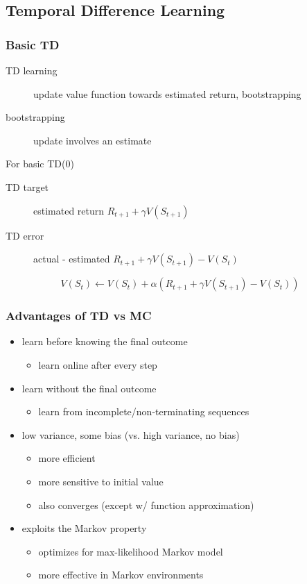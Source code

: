 \documentclass[]{article}
\theoremstyle{definition}
\begin{document}
\subsection{Temporal Difference Learning}%
\label{sub:temporal_difference_learning}

\subsubsection{Basic TD}%
\label{ssub:basic_td}
\begin{description}
    \item[TD learning] update value function towards estimated return, bootstrapping
    \item[bootstrapping] update involves an estimate
\end{description}
For basic TD(0)
\begin{description}
    \item[TD target] estimated return $R_{t+1} + \gamma V(S_{t+1})$
    \item[TD error] actual - estimated $R_{t+1} + \gamma V(S_{t+1}) - V(S_t)$
\end{description}

\begin{equation*}
    V(S_t) \gets V(S_t) + \alpha(R_{t+1} + \gamma V(S_{t+1}) - V(S_t))
\end{equation*}

\subsubsection{Advantages of TD vs MC}%
\label{ssub:advantages_of_td}

\begin{itemize}
    \item learn before knowing the final outcome
        \begin{itemize}
            \item learn online after every step
        \end{itemize}
    \item learn without the final outcome
        \begin{itemize}
            \item learn from incomplete/non-terminating sequences
        \end{itemize}
    \item low variance, some bias (vs. high variance, no bias)
        \begin{itemize}
            \item more efficient
            \item more sensitive to initial value
            \item also converges (except w/ function approximation)
        \end{itemize}
    \item exploits the Markov property
        \begin{itemize}
            \item optimizes for max-likelihood Markov model
            \item more effective in Markov environments
        \end{itemize}
\end{itemize}
\end{document}
